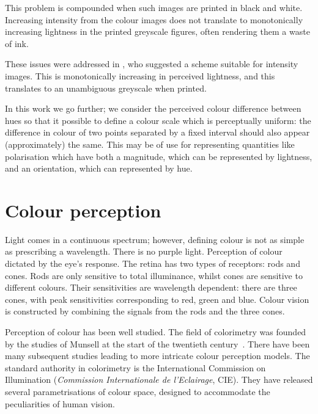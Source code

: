\documentclass[useAMS,usedcolumn,usegraphicx,usenatbib]{mn2e}
\begin{document}
This problem is compounded when such images are printed in black and white. Increasing intensity from the colour images does not translate to monotonically increasing lightness in the printed greyscale figures, often rendering them a waste of ink.

These issues were addressed in \citet{Green2011}, who suggested a scheme suitable for intensity images. This is monotonically increasing in perceived lightness, and this translates to an unambiguous greyscale when printed.

In this work we go further; we consider the perceived colour difference between hues so that it possible to define a colour scale which is perceptually uniform: the difference in colour of two points separated by a fixed interval should also appear (approximately) the same. This may be of use for representing quantities like polarisation which have both a magnitude, which can be represented by lightness, and an orientation, which can represented by hue.

\section{Colour perception}

Light comes in a continuous spectrum; however, defining colour is not as simple as prescribing a wavelength. There is no purple light. Perception of colour dictated by the eye's response. The retina has two types of receptors: rods and cones. Rods are only sensitive to total illuminance, whilst cones are sensitive to different colours. Their sensitivities are wavelength dependent: there are three cones, with peak sensitivities corresponding to red, green and blue. Colour vision is constructed by combining the signals from the rods and the three cones.

Perception of colour has been well studied. The field of colorimetry was founded by the studies of Munsell at the start of the twentieth century~\citep{Munsell1912}. There have been many subsequent studies leading to more intricate colour perception models. The standard authority in colorimetry is the International Commission on Illumination (\textit{Commission Internationale de l'Eclairage}, CIE). They have released several parametrisations of colour space, designed to accommodate the peculiarities of human vision.
\end{document}
